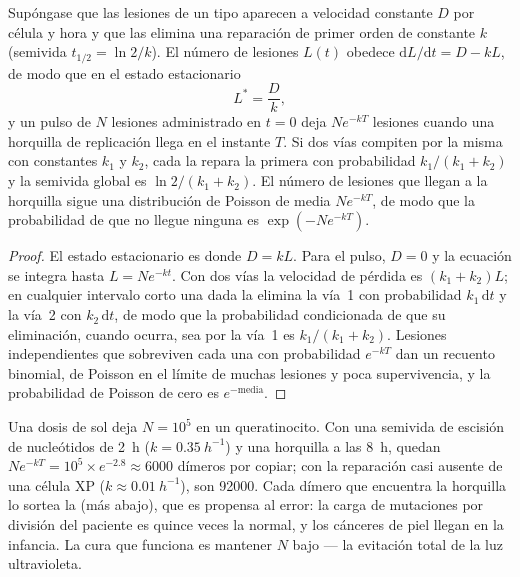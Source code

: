 \begin{theorem}\label{thm:b3:dna-repair:load}
Supóngase que las lesiones de un tipo aparecen a velocidad constante $D$
por célula y hora y que las elimina una reparación de primer orden de
constante $k$ (semivida $t_{1/2} = \ln 2/k$). El número de lesiones
$L(t)$ obedece $\mathrm{d}L/\mathrm{d}t = D - kL$, de modo que en el
estado estacionario
\[
L^{*} = \frac{D}{k},
\]
y un pulso de $N$ lesiones administrado en $t = 0$ deja $N e^{-kT}$
lesiones cuando una horquilla de replicación llega en el instante $T$. Si
dos vías compiten por la misma  con constantes $k_{1}$ y $k_{2}$,
cada  la repara la primera con probabilidad $k_{1}/(k_{1} +
k_{2})$ y la semivida global es $\ln 2/(k_{1} + k_{2})$. El número de
lesiones que llegan a la horquilla sigue una distribución de Poisson de
media $N e^{-kT}$, de modo que la probabilidad de que no llegue ninguna
es $\exp(-N e^{-kT})$.
\end{theorem}
\begin{proof}
El estado estacionario es donde $D = kL$. Para el pulso, $D = 0$ y la
ecuación se integra hasta $L = N e^{-kt}$. Con dos vías la velocidad de
pérdida es $(k_{1} + k_{2})L$; en cualquier intervalo corto una 
dada la elimina la vía~1 con probabilidad $k_{1}\,\mathrm{d}t$ y la
vía~2 con $k_{2}\,\mathrm{d}t$, de modo que la probabilidad condicionada
de que su eliminación, cuando ocurra, sea por la vía~1 es $k_{1}/(k_{1} +
k_{2})$. Lesiones independientes que sobreviven cada una con probabilidad
$e^{-kT}$ dan un recuento binomial, de Poisson en el límite de muchas
lesiones y poca supervivencia, y la probabilidad de Poisson de cero es
$e^{-\text{media}}$.
\end{proof}

\begin{example}\label{ex:b3:dna-repair:xp}
Una dosis de sol deja $N = 10^{5}$  en un
queratinocito. Con una semivida de escisión de nucleótidos de
\qty{2}{h} ($k =
\qty{0.35}{h^{-1}}$) y una horquilla a las \qty{8}{h}, quedan $N e^{-kT} =
10^{5}\times e^{-2.8} \approx 6000$ dímeros por copiar; con la
reparación casi ausente de una célula XP ($k \approx
\qty{0.01}{h^{-1}}$), son \num{92000}. Cada dímero que encuentra la
horquilla lo sortea la  (más abajo), que es propensa
al error: la carga de mutaciones por división del paciente es quince
veces la normal, y los cánceres de piel llegan en la infancia. La cura
que funciona es mantener $N$ bajo --- la evitación total de la luz
ultravioleta.
\end{example}

